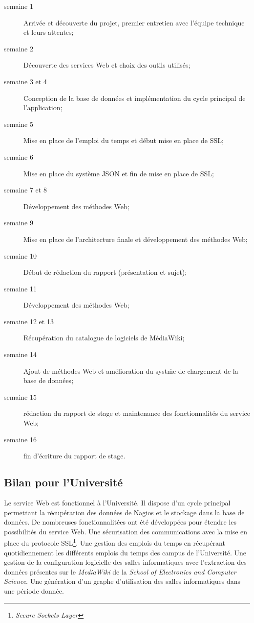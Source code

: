 \begin{description}
	\item[semaine 1] Arriv\'ee et d\'ecouverte du projet, premier entretien avec l'\'equipe technique et leurs attentes;
	\item[semaine 2] D\'ecouverte des services Web et choix des outils utilis\'es;
	\item[semaine 3 et 4] Conception de la base de donn\'ees et impl\'ementation du cycle principal de l'application;
	\item[semaine 5] Mise en place de l'emploi du temps et d\'ebut mise en place de SSL;
	\item[semaine 6] Mise en place du syst\`eme JSON et fin de mise en place de SSL;
	\item[semaine 7 et 8] D\'eveloppement des m\'ethodes Web;
	\item[semaine 9] Mise en place de l'architecture finale et d\'eveloppement des m\'ethodes Web;
	\item[semaine 10] D\'ebut de r\'edaction du rapport (pr\'esentation et sujet);
	\item[semaine 11] D\'eveloppement des m\'ethodes Web;
	\item[semaine 12 et 13] R\'ecup\'eration du catalogue de logiciels de M\'ediaWiki;
	\item[semaine 14] Ajout de m\'ethodes Web et am\'elioration du syst\`me de chargement de la base de donn\'ees;
	\item[semaine 15] r\'edaction du rapport de stage et maintenance des fonctionnalit\'es du service Web;
	\item[semaine 16] fin d'\'ecriture du rapport de stage.

\end{description}

\subsection{Bilan pour l'Universit\'e}

Le service Web est fonctionnel \`a l'Universit\'e.
Il dispose d'un cycle principal permettant la r\'ecup\'eration des donn\'ees de Nagios et le stockage dans la base de donn\'ees.
De nombreuses fonctionnalit\'ees ont \'et\'e d\'evelopp\'ees pour \'etendre les possibilit\'es du service Web.
Une s\'ecurisation des communications avec la mise en place du protocole SSL\protect\footnote{\textit{Secure Sockets Layer}}.
Une gestion des emplois du temps en r\'ecup\'erant quotidiennement les diff\'erents emplois du temps des campus de l'Universit\'e.
Une gestion de la configuration logicielle des salles informatiques avec l'extraction des donn\'ees pr\'esentes sur le \textit{MediaWiki} de la \textit{School of Electronics and Computer Science}.
Une g\'en\'eration d'un graphe d'utilisation des salles informatiques dans une p\'eriode donn\'ee.

